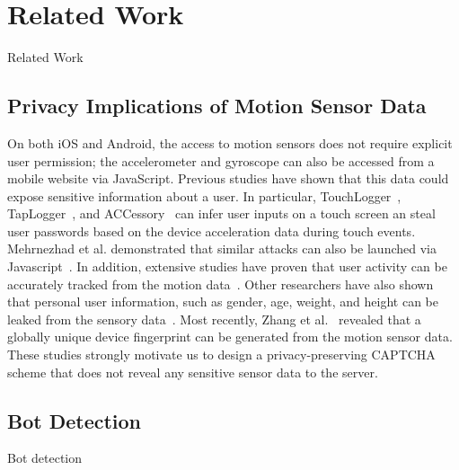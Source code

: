 \section{Related Work}
Related Work

\subsection{Privacy Implications of Motion Sensor Data}
On both iOS and Android, the access to motion sensors does not require explicit user permission; the accelerometer and gyroscope can also be accessed from a mobile website via JavaScript. Previous studies have shown that this data could expose sensitive information about a user. In particular, TouchLogger~\cite{Cai:2011:TIK:2028040.2028049}, TapLogger~\cite{xu2012taplogger}, and ACCessory~\cite{owusu2012accessory} can infer user inputs on a touch screen an steal user passwords based on the device acceleration data during touch events. Mehrnezhad et al. demonstrated that similar attacks can also be launched via Javascript~\cite{mehrnezhad2016touchsignatures}. In addition, extensive studies have proven that user activity can be accurately tracked from the motion data~\cite{REYESORTIZ2016754,SANSEGUNDO2018190}. Other researchers have also shown that personal user information, such as gender, age, weight, and height can be leaked from the sensory data~\cite{Malekzadeh:2018:PSD:3195258.3195260,davarci2017age}. Most recently, Zhang et al.~\cite{zhang2019sensorid} revealed that a globally unique device fingerprint can be generated from the motion sensor data. These studies strongly motivate us to design a privacy-preserving CAPTCHA scheme that does not reveal any sensitive sensor data to the server.

\subsection{Bot Detection}
Bot detection

